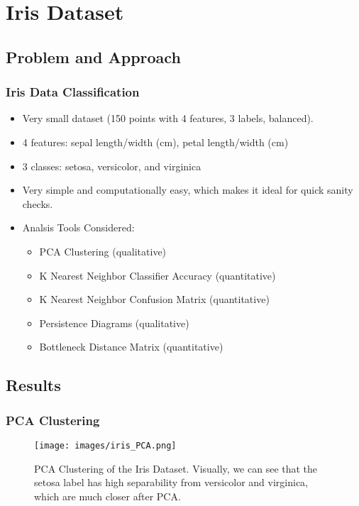 \section{Iris Dataset}
	\subsection{Problem and Approach}
		\begin{frame}
		\frametitle{Iris Data Classification}
		
		\begin{itemize}
			\item Very small dataset (150 points with 4 features, 3 labels, balanced).
			\item 4 features: sepal length/width (cm), petal length/width (cm) 
			\item 3 classes: setosa, versicolor, and virginica
			\item Very simple and computationally easy, which makes it ideal for quick sanity checks.
			\item Analsis Tools Considered:
				\begin{itemize}
					\item PCA Clustering (qualitative)
					\item K Nearest Neighbor Classifier Accuracy (quantitative)
					\item K Nearest Neighbor Confusion Matrix (quantitative)
					\item Persistence Diagrams (qualitative)
					\item Bottleneck Distance Matrix (quantitative)
				\end{itemize}
		\end{itemize}
		
		\end{frame}
		
	\subsection{Results}
		
		\begin{frame}
		\frametitle{PCA Clustering}
		
		\begin{figure}
				\centering
				\texttt{[image: images/iris\_PCA.png]}
				\caption{PCA Clustering of the Iris Dataset. Visually, we can see that the setosa label has high separability from versicolor and virginica, which are much closer after PCA.}
		\end{figure}
		
		\end{frame}
		
